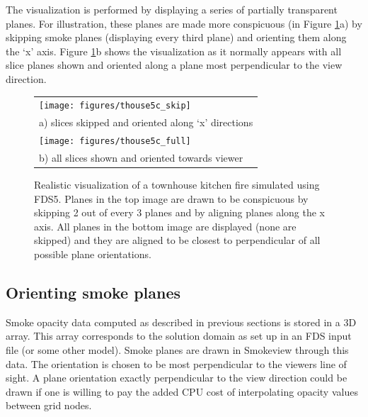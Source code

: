 \documentclass[11pt,twoside]{book}
\newcommand{\figoptions}{htp}
\begin{document}
The visualization is performed by displaying a series of partially
transparent planes. For illustration, these planes are made more
conspicuous (in Figure \ref{figsmoke3d}a) by skipping smoke planes
(displaying every third plane) and orienting them along the `x'
axis. Figure \ref{figsmoke3d}b shows the visualization as it
normally appears with all slice planes shown and oriented along a
plane most perpendicular to the view direction.
\begin{figure}[\figoptions]
\begin{center}
\begin{tabular}{l}
\texttt{[image: figures/thouse5c\_skip]}\\
a) slices skipped and oriented along `x' directions\\
\texttt{[image: figures/thouse5c\_full]}\\
b) all slices shown and oriented towards viewer \\
\end{tabular}
\end{center}
\caption{Realistic visualization of a townhouse kitchen fire simulated
using FDS5. Planes in the top image are drawn to be conspicuous by
skipping 2 out of every 3 planes and by aligning planes along the
x axis. All planes in the bottom image are displayed (none are
skipped) and they are aligned to be closest to perpendicular of
all possible plane orientations.
  }
\label{figsmoke3d}%
\end{figure}

%
%



%
%

\subsection{Orienting smoke planes}

Smoke opacity data computed as described in previous sections is stored in a 3D array.
This array corresponds to the solution domain as set up in an FDS input file (or some other model).
Smoke planes are drawn in Smokeview through this data.  The orientation is chosen to be most perpendicular
to the viewers line of sight.  A plane orientation exactly perpendicular to the view direction could be drawn
if one is willing to pay the added CPU cost of interpolating opacity values between grid nodes.
\end{document}
